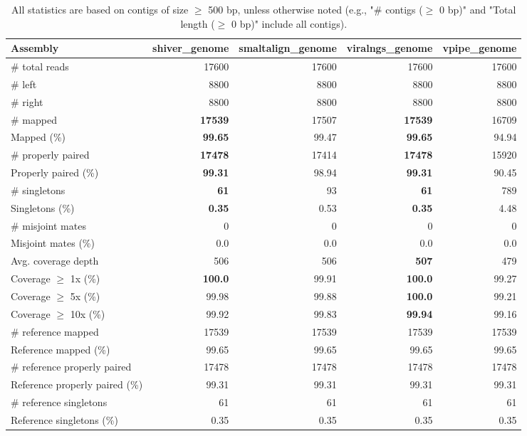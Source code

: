 \documentclass[12pt,a4paper]{article}
\begin{document}
\begin{table}[ht]
\begin{center}
\caption{All statistics are based on contigs of size $\geq$ 500 bp, unless otherwise noted (e.g., "\# contigs ($\geq$ 0 bp)" and "Total length ($\geq$ 0 bp)" include all contigs).}
\begin{tabular}{|l*{4}{|r}|}
\hline
Assembly & shiver\_genome & smaltalign\_genome & viralngs\_genome & vpipe\_genome \\ \hline
\# total reads & 17600 & 17600 & 17600 & 17600 \\ \hline
\# left & 8800 & 8800 & 8800 & 8800 \\ \hline
\# right & 8800 & 8800 & 8800 & 8800 \\ \hline
\# mapped & {\bf 17539} & 17507 & {\bf 17539} & 16709 \\ \hline
Mapped (\%) & {\bf 99.65} & 99.47 & {\bf 99.65} & 94.94 \\ \hline
\# properly paired & {\bf 17478} & 17414 & {\bf 17478} & 15920 \\ \hline
Properly paired (\%) & {\bf 99.31} & 98.94 & {\bf 99.31} & 90.45 \\ \hline
\# singletons & {\bf 61} & 93 & {\bf 61} & 789 \\ \hline
Singletons (\%) & {\bf 0.35} & 0.53 & {\bf 0.35} & 4.48 \\ \hline
\# misjoint mates & 0 & 0 & 0 & 0 \\ \hline
Misjoint mates (\%) & 0.0 & 0.0 & 0.0 & 0.0 \\ \hline
Avg. coverage depth & 506 & 506 & {\bf 507} & 479 \\ \hline
Coverage $\geq$ 1x (\%) & {\bf 100.0} & 99.91 & {\bf 100.0} & 99.27 \\ \hline
Coverage $\geq$ 5x (\%) & 99.98 & 99.88 & {\bf 100.0} & 99.21 \\ \hline
Coverage $\geq$ 10x (\%) & 99.92 & 99.83 & {\bf 99.94} & 99.16 \\ \hline
\# reference mapped & 17539 & 17539 & 17539 & 17539 \\ \hline
Reference mapped (\%) & 99.65 & 99.65 & 99.65 & 99.65 \\ \hline
\# reference properly paired & 17478 & 17478 & 17478 & 17478 \\ \hline
Reference properly paired (\%) & 99.31 & 99.31 & 99.31 & 99.31 \\ \hline
\# reference singletons & 61 & 61 & 61 & 61 \\ \hline
Reference singletons (\%) & 0.35 & 0.35 & 0.35 & 0.35 \\ \hline

\end{tabular}
\end{center}
\end{table}
\end{document}
